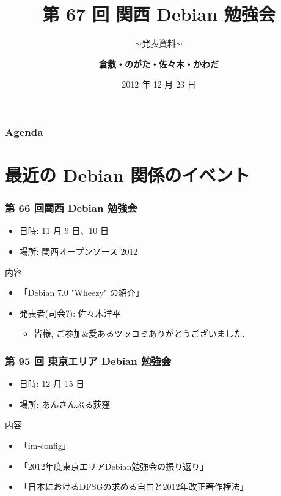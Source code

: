 \documentclass[cjk,dvipdfmx,10pt,compress,%
hyperref={bookmarks=true,bookmarksnumbered=true,bookmarksopen=false,%
colorlinks=false,%
pdftitle={第 67 回 関西 Debian 勉強会},%
pdfauthor={倉敷・のがた・佐々木・かわだ},%
pdfsubject={資料},%
}]{beamer}
\title{第 67 回 関西 Debian 勉強会}
\subtitle{$\sim$発表資料$\sim$}
\author[かわだ てつたろう]{{\large\bf 倉敷・のがた・佐々木・かわだ}}
\institute[Debian JP]{{\normalsize\tt 関西 Debian 勉強会}}
\date{{\small 2012 年 12 月 23 日}}
\begin{document}
\settitleslide
\begin{frame}
\titlepage
\end{frame}
\setdefaultslide

\begin{frame}[fragile]
\frametitle{Agenda}

\tableofcontents

\end{frame}

\section{最近の Debian 関係のイベント}


\begin{frame}[fragile]
  \frametitle{第 66 回関西 Debian 勉強会}
  \begin{itemize}
  \item 日時: 11 月 9 日、10 日
  \item 場所: 関西オープンソース 2012
  \end{itemize}
  \begin{block}{内容}
    \begin{itemize}
    \item「Debian 7.0 "Wheezy" の紹介」
    \item 発表者(司会?): 佐々木洋平
      \begin{itemize}
      \item 皆様, ご参加\&愛あるツッコミありがとうございました.
      \end{itemize}
    \end{itemize}
  \end{block}
\end{frame}

\begin{frame}[fragile]
  \frametitle{第 95 回 東京エリア Debian 勉強会}
  \begin{itemize}
  \item 日時: 12 月 15 日
  \item 場所: あんさんぶる荻窪
  \end{itemize}
  \begin{block}{内容}
    \begin{itemize}
    \item 「im-config」
    \item 「2012年度東京エリアDebian勉強会の振り返り」
    \item 「日本におけるDFSGの求める自由と2012年改正著作権法」
    \end{itemize}
  \end{block}
\end{frame}
\end{document}
